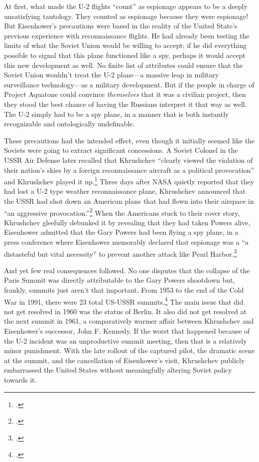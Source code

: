\documentclass[14pt]{extarticle}
\begin{document}
At first, what made the U-2 flights \enquote{count} as espionage appears to be a deeply unsatisfying tautology. They counted as espionage because they were espionage! But Eisenhower's precautions were based in the reality of the United State's previous experience with reconnaissance flights. He had already been testing the limits of what the Soviet Union would be willing to accept; if he did everything possible to signal that this plane functioned like a spy, perhaps it would accept this new development as well. No finite list of attributes could ensure that the Soviet Union wouldn't treat the U-2 plane---a massive leap in military surveillance technology---as a military development. But if the people in charge of Project Aquatone could convince \emph{themselves} that it was a civilian project, then they stood the best chance of having the Russians interpret it that way as well. The U-2 simply had to be a spy plane, in a manner that is both instantly recognizable and ontologically undefinable.

These precautions had the intended effect, even though it initially seemed like the Soviets were going to extract significant concessions. A Soviet Colonel in the USSR Air Defense later recalled that Khrushchev ``clearly viewed the violation of their nation's skies by a foreign reconnaissance aircraft \textelp{} as a political provocation'' and Khrushchev played it up.\footcite{orlov_u-2_2007} Three days after NASA quietly reported that they had lost a U-2 type weather reconnaissance plane, Khrushchev announced that the USSR had shot down an American plane that had flown into their airspace in \enquote{an aggressive provocation.}\footcite[p.~112]{powers_operation_2004} When the Americans stuck to their cover story, Khrushchev gleefully debunked it by revealing that they had taken Powers alive, Eisenhower admitted that the Gary Powers had been flying a spy plane, in a press conference where Eisenhower memorably declared that espionage was a \enquote{a distasteful but vital necessity} to prevent another attack like Pearl Harbor.\footcite{eisenhower_news_1960}

And yet few real consequences followed. No one disputes that the collapse of the Paris Summit was directly attributable to the Gary Powers shootdown but, frankly, summits just aren't that important. From 1953 to the end of the Cold War in 1991, there were 23 total US-USSR summits.\footcite{fain_chronology_2011} The main issue that did not get resolved in 1960 was the status of Berlin. It also did not get resolved at the next summit in 1961, a comparatively warmer affair between Khrushchev and Eisenhower's successor, John F. Kennedy. If the worst that happened because of the U-2 incident was an unproductive summit meeting, then that is a relatively minor punishment. With the late rollout of the captured pilot, the dramatic scene at the summit, and the cancellation of Eisenhower's visit, Khrushchev publicly embarrassed the United States without meaningfully altering Soviet policy towards it.
\end{document}
